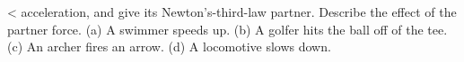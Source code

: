 <%
acceleration, and give its Newton's-third-law partner.
Describe the effect of the partner force. (a) A swimmer
speeds up. (b) A golfer hits the ball off of the tee. (c) An
archer fires an arrow. (d) A locomotive slows down.
